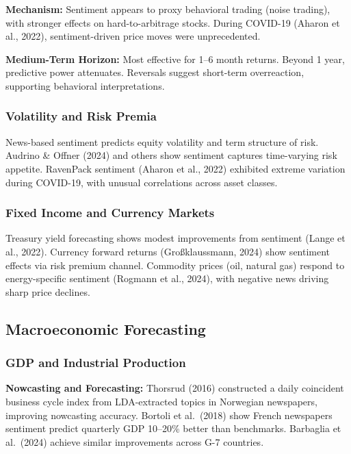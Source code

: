 \documentclass[12pt,a4paper]{article}
\begin{document}
\textbf{Mechanism:} Sentiment appears to proxy behavioral trading (noise trading), with stronger effects on hard-to-arbitrage stocks. During COVID-19 (Aharon et al., 2022), sentiment-driven price moves were unprecedented.

\textbf{Medium-Term Horizon:} Most effective for 1--6 month returns. Beyond 1 year, predictive power attenuates. Reversals suggest short-term overreaction, supporting behavioral interpretations.

\subsubsection{Volatility and Risk Premia}

News-based sentiment predicts equity volatility and term structure of risk. Audrino \& Offner (2024) and others show sentiment captures time-varying risk appetite. RavenPack sentiment (Aharon et al., 2022) exhibited extreme variation during COVID-19, with unusual correlations across asset classes.

\subsubsection{Fixed Income and Currency Markets}

Treasury yield forecasting shows modest improvements from sentiment (Lange et al., 2022). Currency forward returns (Großklaussmann, 2024) show sentiment effects via risk premium channel. Commodity prices (oil, natural gas) respond to energy-specific sentiment (Rogmann et al., 2024), with negative news driving sharp price declines.

\subsection{Macroeconomic Forecasting}
\label{subsec:macro}

\subsubsection{GDP and Industrial Production}

\textbf{Nowcasting and Forecasting:} Thorsrud (2016) constructed a daily coincident business cycle index from LDA-extracted topics in Norwegian newspapers, improving nowcasting accuracy. Bortoli et al.\ (2018) show French newspapers sentiment predict quarterly GDP 10--20\% better than benchmarks. Barbaglia et al.\ (2024) achieve similar improvements across G-7 countries.
\end{document}
